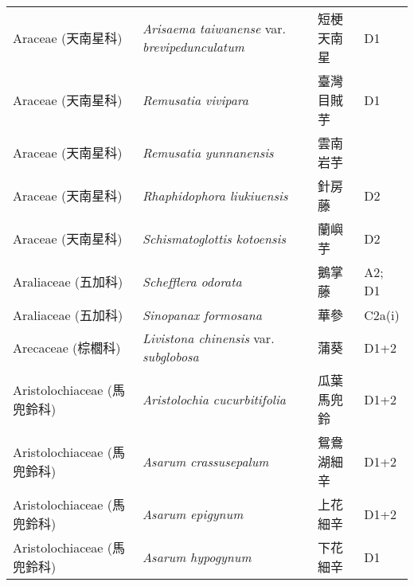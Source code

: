 \begin{longtable}{p{3cm}p{5cm}p{3cm}p{4cm}}
    Araceae (天南星科) & \textit{Arisaema taiwanense} var. \textit{brevipedunculatum}  & 短梗天南星 & D1 \index{Arisaema@\textit{Arisaema}!taiwanense@\textit{taiwanense}!var. brevipedunculatum@var. \textit{brevipedunculatum}}  \index{短梗天南星} \\
    Araceae (天南星科) & \textit{Remusatia vivipara}  & 臺灣目賊芋 & D1 \index{Remusatia@\textit{Remusatia}!vivipara@\textit{vivipara}}  \index{臺灣目賊芋} \\
    Araceae (天南星科) & \textit{Remusatia yunnanensis}  & 雲南岩芋 &  \index{Remusatia@\textit{Remusatia}!yunnanensis@\textit{yunnanensis}}  \index{雲南岩芋} \\
    Araceae (天南星科) & \textit{Rhaphidophora liukiuensis}  & 針房藤 & D2 \index{Rhaphidophora@\textit{Rhaphidophora}!liukiuensis@\textit{liukiuensis}}  \index{針房藤} \\
    Araceae (天南星科) & \textit{Schismatoglottis kotoensis}  & 蘭嶼芋 & D2 \index{Schismatoglottis@\textit{Schismatoglottis}!kotoensis@\textit{kotoensis}}  \index{蘭嶼芋} \\
    Araliaceae (五加科) & \textit{Schefflera odorata}  & 鵝掌藤 & A2; D1 \index{Schefflera@\textit{Schefflera}!odorata@\textit{odorata}}  \index{鵝掌藤} \\
    Araliaceae (五加科) & \textit{Sinopanax formosana}  & 華參 & C2a(i) \index{Sinopanax@\textit{Sinopanax}!formosana@\textit{formosana}}  \index{華參} \\
    Arecaceae (棕櫚科) & \textit{Livistona chinensis} var. \textit{subglobosa}  & 蒲葵 & D1+2 \index{Livistona@\textit{Livistona}!chinensis@\textit{chinensis}!var. subglobosa@var. \textit{subglobosa}}  \index{蒲葵} \\
    Aristolochiaceae (馬兜鈴科) & \textit{Aristolochia cucurbitifolia}  & 瓜葉馬兜鈴 & D1+2 \index{Aristolochia@\textit{Aristolochia}!cucurbitifolia@\textit{cucurbitifolia}}  \index{瓜葉馬兜鈴} \\
    Aristolochiaceae (馬兜鈴科) & \textit{Asarum crassusepalum}  & 鴛鴦湖細辛 & D1+2 \index{Asarum@\textit{Asarum}!crassusepalum@\textit{crassusepalum}}  \index{鴛鴦湖細辛} \\
    Aristolochiaceae (馬兜鈴科) & \textit{Asarum epigynum}  & 上花細辛 & D1+2 \index{Asarum@\textit{Asarum}!epigynum@\textit{epigynum}}  \index{上花細辛} \\
    Aristolochiaceae (馬兜鈴科) & \textit{Asarum hypogynum}  & 下花細辛 & D1 \index{Asarum@\textit{Asarum}!hypogynum@\textit{hypogynum}}  \index{下花細辛} \\

\end{longtable}
